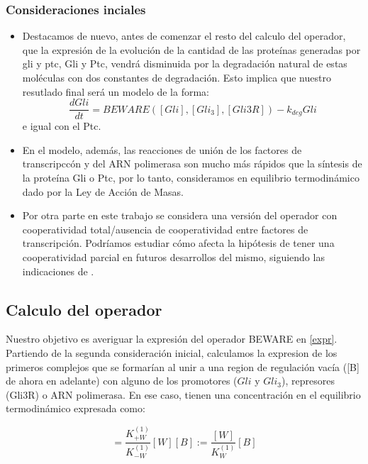 \subsubsection{Consideraciones inciales}
\begin{itemize}

\item Destacamos de nuevo, antes de comenzar el resto del calculo del operador, que la expresión de la evolución de la cantidad de las proteínas generadas por gli y ptc, Gli y Ptc, vendrá disminuida por la degradación natural de estas moléculas con dos constantes de degradación. Esto implica que nuestro resutlado final será un modelo de la forma:
\begin{equation}
\frac{dGli}{dt}=BEWARE([Gli],[Gli_3],[Gli3R])-k_{deg}Gli
\label{expr}
\end{equation}
e igual con el Ptc.

\item En el modelo, además, las reacciones de unión de los factores de transcripccón y del ARN polimerasa son mucho más rápidos que la síntesis de la proteína Gli o Ptc, por lo tanto, consideramos en equilibrio termodinámico dado por la Ley de Acción de Masas.

\item Por otra parte en este trabajo se considera una versión del operador con cooperatividad total/ausencia de cooperatividad entre factores de transcripción. Podríamos estudiar cómo afecta la hipótesis de tener una cooperatividad parcial en futuros desarrollos del mismo, siguiendo las indicaciones de \cite{cambon1}.
	 
\end{itemize}

\subsection{Calculo del operador}
Nuestro objetivo es averiguar la expresión del operador BEWARE en \ref{expr}.
Partiendo de la segunda consideración inicial, calculamos la expresion de los primeros complejos que se formarían al unir a una region de regulación vacía ([B] de ahora en adelante) con alguno de los promotores ($Gli$ y $Gli_3$), represores (Gli3R) o ARN polimerasa. En ese caso, tienen una concentración en el equilibrio termodinámico expresada como:

\begin{equation}
[BW]=\frac{K^{(1)}_{+W}}{K^{(1)}_{-W}}[W][B]:=\frac{[W]}{K^{(1)}_W}[B]
\end{equation}

